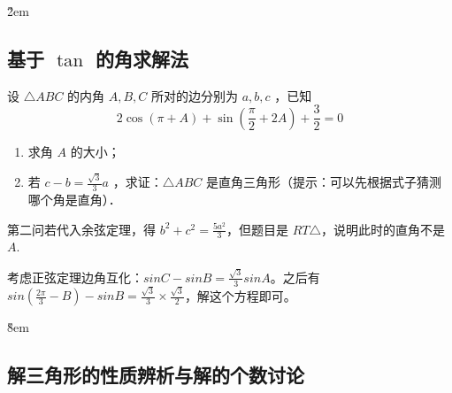 \v{2em}

\subsection{基于 $\tan$ 的角求解法}

\begin{example}
    设 $\triangle A B C$ 的内角 $A, B, C$ 所对的边分别为 $a, b, c$ ，已知
    $$
        2 \cos (\pi+A)+\sin \left(\frac{\pi}{2}+2 A\right)+\frac{3}{2}=0
    $$
    \begin{enumerate}
        \item 求角 $A$ 的大小；
        \item 若 $c-b=\frac{\sqrt{3}}{3} a$ ，求证：$\triangle A B C$ 是直角三角形（提示：可以先根据式子猜测哪个角是直角）．
    \end{enumerate}
\end{example}

\begin{tips}
    第二问若代入余弦定理，得 $b^2 + c^2 = \frac{5a^2}{3}$，但题目是 $RT \triangle$，说明此时的直角不是 $A$.

    考虑正弦定理边角互化：$sinC-sinB=\frac{\sqrt{3}}{3}sinA$。之后有 $sin(\frac{2\pi}{3}-B) - sinB = \frac{\sqrt{3}}{3} \times \frac{\sqrt{3}}{2}$，解这个方程即可。
\end{tips}

\v{8em}

\subsection{解三角形的性质辨析与解的个数讨论}

